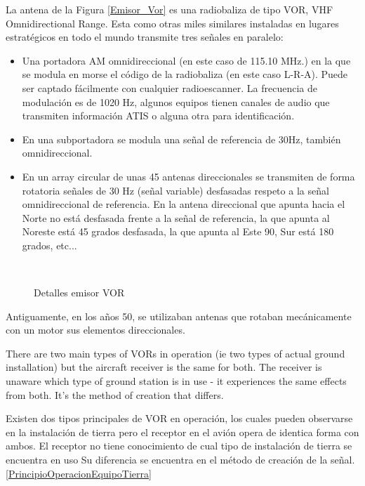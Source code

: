 La antena de la Figura \ref{Emisor_Vor} es una radiobaliza de tipo VOR, VHF Omnidirectional Range. Esta como otras miles similares instaladas en lugares estratégicos en todo el mundo transmite tres señales en paralelo:
\begin{itemize}
 \item Una portadora AM omnidireccional (en este caso de 115.10 MHz.) en la que se modula en morse el código de la radiobaliza (en este caso L-R-A). Puede ser captado fácilmente con cualquier radioescanner. La frecuencia de modulación es de 1020 Hz, algunos equipos tienen canales de audio que transmiten información ATIS o alguna otra para identificación.
\item En una subportadora se modula una señal de referencia de 30Hz,  también omnidireccional. 
\item En un array circular de unas 45 antenas direccionales se transmiten de forma rotatoria señales de 30 Hz (señal variable) desfasadas respeto a la señal omnidireccional de referencia. En la antena direccional que apunta hacia el Norte no está desfasada frente a la señal de referencia, la que apunta al Noreste está 45 grados desfasada, la que apunta al Este 90, Sur está 180 grados, etc...
\end{itemize}

\begin{figure}[h]
     \centering
     \hspace{.3in}
     \\
     \vspace{.3in}
\caption{Detalles emisor VOR}
\end{figure}

 
Antiguamente, en los años 50, se utilizaban antenas que rotaban mecánicamente con un motor sus elementos direccionales.

There are two main types of VORs in operation (ie two types of actual ground installation) but the aircraft receiver is the same for both. The receiver is unaware which type of ground station is in use - it experiences the same effects from both. It's the method of creation that differs.

Existen dos tipos principales de VOR en operación, los cuales pueden observarse en la instalación de tierra pero el receptor en el avión opera de identica forma con ambos. El receptor no tiene conocimiento de cual tipo de instalación de tierra se encuentra en uso Su diferencia se encuentra en el método de creación de la señal. \ref{PrincipioOperacionEquipoTierra}

